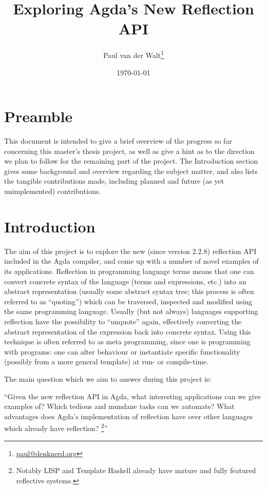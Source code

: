 \documentclass[a4paper]{article}
\author{Paul van der Walt\footnote{\url{paul@denknerd.org}}}
\date{\today}
\title{Exploring Agda's New Reflection API}
\begin{document}
\maketitle


\section{Preamble}

This document is intended to give a brief overview of the progress so far concerning
this master's thesis project, as well as give a hint as to the direction we plan to follow
for the remaining part of the project. The Introduction section gives some background and
overview regarding the subject matter, and also lists
the tangible contributions made, including planned and future (as yet unimplemented) contributions.


\section{Introduction}

The aim of this project is to explore the new (since version 2.2.8) reflection API included in the Agda
compiler, and come up with a number of novel examples of its applications. Reflection in programming language
terms means that one can convert concrete syntax of the language (terms and expressions, etc.) into an abstract
representation (usually some abstract syntax tree; this process is often referred to as ``quoting'')
which can be traversed, inspected and modified using the same programming
language. Usually (but not always) languages supporting reflection have the possibility to
``unquote'' again, effectively
converting the abstract representation of the expression back into concrete syntax. Using this technique is often referred to as meta programming,
since one is programming with programs: one can alter behaviour
or instantiate specific functionality (possibly from a more general template) at run- or compile-time.

The main question which we aim to answer during this project is:

``Given the new reflection API in Agda, what interesting applications can we give
examples of? Which tedious and mundane tasks can we automate? What advantages does
Agda's implementation of reflection have over other languages which already have reflection?
\footnote{Notably LISP and Template Haskell already have mature and fully featured reflective systems.}''
\end{document}
